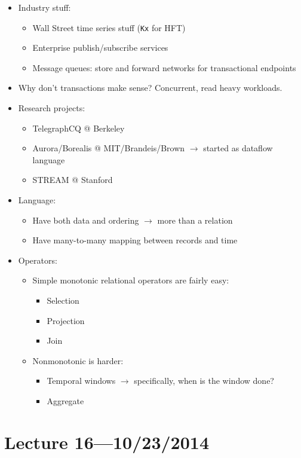 \documentclass[10pt]{article}
\begin{document}
\begin{itemize}
\item Industry stuff:
\begin{itemize}
\item Wall Street time series stuff (\texttt{Kx} for HFT)
\item Enterprise publish/subscribe services
\item Message queues: store and forward networks for transactional endpoints
\end{itemize}
\item Why don't transactions make sense? Concurrent, read heavy workloads.
\item Research projects:
\begin{itemize}
\item TelegraphCQ @ Berkeley
\item Aurora/Borealis @ MIT/Brandeis/Brown $\rightarrow$ started as dataflow language
\item STREAM @ Stanford
\end{itemize}
\item Language:
\begin{itemize}
\item Have both data and ordering $\rightarrow$ more than a relation
\item Have many-to-many mapping between records and time
\end{itemize}
\item Operators:
\begin{itemize}
\item Simple monotonic relational operators are fairly easy:
\begin{itemize}
\item Selection
\item Projection
\item Join
\end{itemize}
\item Nonmonotonic is harder:
\begin{itemize}
\item Temporal windows $\rightarrow$ specifically, when is the window done?
\item Aggregate
\end{itemize}
\end{itemize}
\end{itemize}

\section{Lecture 16---10/23/2014}
\end{document}

